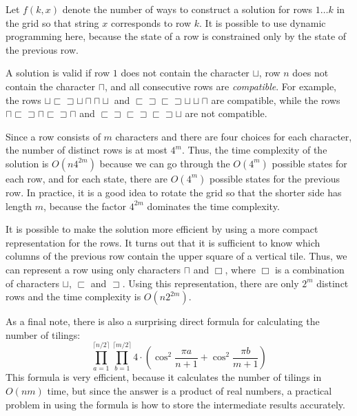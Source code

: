 Let $f(k,x)$ denote the number of ways to
construct a solution for rows $1 \ldots k$
in the grid so that string $x$ corresponds to row $k$.
It is possible to use dynamic programming here,
because the state of a row is constrained
only by the state of the previous row.

A solution is valid if row $1$ does not contain
the character $\sqcup$,
row $n$ does not contain the character $\sqcap$,
and all consecutive rows are \emph{compatible}.
For example, the rows
$\sqcup \sqsubset \sqsupset \sqcup \sqcap \sqcap \sqcup$ and
$\sqsubset \sqsupset \sqsubset \sqsupset \sqcup \sqcup \sqcap$ 
are compatible, while the rows
$\sqcap \sqsubset \sqsupset \sqcap \sqsubset \sqsupset \sqcap$ and
$\sqsubset \sqsupset \sqsubset \sqsupset \sqsubset \sqsupset \sqcup$
are not compatible.

Since a row consists of $m$ characters and there are
four choices for each character, the number of distinct
rows is at most $4^m$.
Thus, the time complexity of the solution is
$O(n 4^{2m})$ because we can go through the
$O(4^m)$ possible states for each row,
and for each state, there are $O(4^m)$
possible states for the previous row.
In practice, it is a good idea to rotate the grid
so that the shorter side has length $m$,
because the factor $4^{2m}$ dominates the time complexity.

It is possible to make the solution more efficient
by using a more compact representation for the rows.
It turns out that it is sufficient to know which
columns of the previous row contain the upper square
of a vertical tile.
Thus, we can represent a row using only characters
$\sqcap$ and $\Box$, where $\Box$ is a combination
of characters
$\sqcup$, $\sqsubset$ and $\sqsupset$.
Using this representation, there are only
$2^m$ distinct rows and the time complexity is
$O(n 2^{2m})$.

As a final note, there is also a surprising direct formula
for calculating the number of tilings:
\[ \prod_{a=1}^{\lceil n/2 \rceil} \prod_{b=1}^{\lceil m/2 \rceil} 4 \cdot (\cos^2 \frac{\pi a}{n + 1} + \cos^2 \frac{\pi b}{m+1})\]
This formula is very efficient, because it calculates
the number of tilings in $O(nm)$ time,
but since the answer is a product of real numbers,
a practical problem in using the formula is
how to store the intermediate results accurately.


